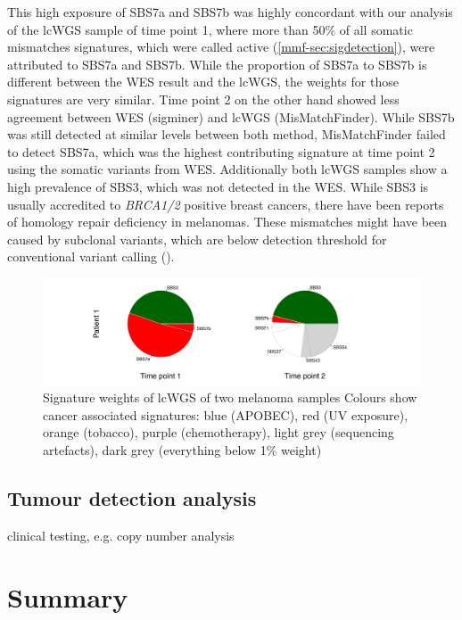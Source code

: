 This high exposure of SBS7a and SBS7b was highly concordant with our analysis of the lcWGS sample of time point 1, where more than 50\% of all somatic mismatches signatures, which were called active (\autoref{mmf-sec:sigdetection}), were attributed to SBS7a and SBS7b. While the proportion of SBS7a to SBS7b is different between the WES result and the lcWGS, the weights for those signatures are very similar. Time point 2 on the other hand showed less agreement between WES (sigminer) and lcWGS (MisMatchFinder). While SBS7b was still detected at similar levels between both method, MisMatchFinder failed to detect SBS7a, which was the highest contributing signature at time point 2 using the somatic variants from WES. Additionally both lcWGS samples show a high prevalence of SBS3, which was not detected in the WES. While SBS3 is usually accredited to \textit{BRCA1/2} positive breast cancers, there have been reports of homology repair deficiency in melanomas. These mismatches might have been caused by subclonal variants, which are below detection threshold for conventional variant calling ().

\begin{figure}[ht]
\centering
\includegraphics[width=.99\linewidth]{Figures/MisMatchFinder/melanomaMMFsignatures.pdf}
\caption[Signature weights of lcWGS of two melanoma samples]{Signature weights of lcWGS of two melanoma samples Colours show cancer associated signatures: blue (APOBEC), red (UV exposure), orange (tobacco), purple (chemotherapy), light grey (sequencing artefacts), dark grey (everything below 1\% weight)}\label{fig:mmf-melaWESsigPie}
\end{figure}


\subsection{ Tumour detection analysis}
\label{mmf-sec:tumourDetection}

clinical testing, e.g. copy number analysis \cite{Homburger2019,Chen2021}


\section{Summary}

